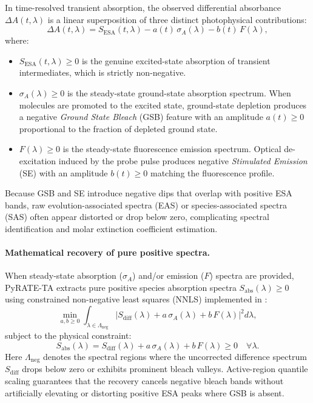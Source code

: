 In time-resolved transient absorption, the observed differential absorbance $\Delta A(t, \lambda)$ is a linear superposition of three distinct photophysical contributions:
\begin{equation}
  \Delta A(t, \lambda) = S_{\mathrm{ESA}}(t, \lambda) - a(t)\, \sigma_A(\lambda) - b(t)\, F(\lambda),
\end{equation}
where:
\begin{itemize}
  \item $S_{\mathrm{ESA}}(t, \lambda) \ge 0$ is the genuine excited-state absorption of transient intermediates, which is strictly non-negative.
  \item $\sigma_A(\lambda) \ge 0$ is the steady-state ground-state absorption spectrum. When molecules are promoted to the excited state, ground-state depletion produces a negative \emph{Ground State Bleach} (GSB) feature with an amplitude $a(t) \ge 0$ proportional to the fraction of depleted ground state.
  \item $F(\lambda) \ge 0$ is the steady-state fluorescence emission spectrum. Optical de-excitation induced by the probe pulse produces negative \emph{Stimulated Emission} (SE) with an amplitude $b(t) \ge 0$ matching the fluorescence profile.
\end{itemize}

Because GSB and SE introduce negative dips that overlap with positive ESA bands, raw evolution-associated spectra (EAS) or species-associated spectra (SAS) often appear distorted or drop below zero, complicating spectral identification and molar extinction coefficient estimation.

\paragraph{Mathematical recovery of pure positive spectra.}
When steady-state absorption ($\sigma_A$) and/or emission ($F$) spectra are provided, PyRATE-TA extracts pure positive species absorption spectra $S_{\mathrm{abs}}(\lambda) \ge 0$ using constrained non-negative least squares (NNLS) implemented in :
\begin{equation}
  \min_{a, b \ge 0} \int_{\lambda \in \Lambda_{\mathrm{neg}}} \left| S_{\mathrm{diff}}(\lambda) + a\, \sigma_A(\lambda) + b\, F(\lambda) \right|^2 d\lambda,
\end{equation}
subject to the physical constraint:
\begin{equation}
  S_{\mathrm{abs}}(\lambda) = S_{\mathrm{diff}}(\lambda) + a\, \sigma_A(\lambda) + b\, F(\lambda) \ge 0 \quad \forall \lambda.
\end{equation}
Here $\Lambda_{\mathrm{neg}}$ denotes the spectral regions where the uncorrected difference spectrum $S_{\mathrm{diff}}$ drops below zero or exhibits prominent bleach valleys. Active-region quantile scaling guarantees that the recovery cancels negative bleach bands without artificially elevating or distorting positive ESA peaks where GSB is absent.

